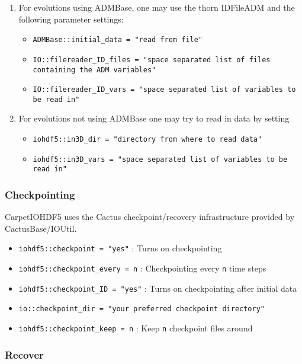 \begin{enumerate}
  \item For evolutions using ADMBase, one may use the thorn IDFileADM and the following parameter settings:
    \begin{itemize}
      \item {\tt ADMBase::initial\_data  = "read from file"}
      \item {\tt IO::filereader\_ID\_files = "space separated list of files containing the ADM variables"}
      \item {\tt IO::filereader\_ID\_vars = "space separated list of variables to be read in"}
    \end{itemize}
  \item For evolutions not using ADMBase one may try to read in data by setting
    \begin{itemize}
      \item {\tt iohdf5::in3D\_dir = "directory from where to read data"}
      \item {\tt iohdf5::in3D\_vars = "space separated list of variables to be read in"}
    \end{itemize}
\end{enumerate}


\subsubsection{Checkpointing}

CarpetIOHDF5 uses the Cactus checkpoint/recovery infrastructure provided by
CactusBase/IOUtil.

\begin{itemize}
  \item {\tt iohdf5::checkpoint = "yes"} : Turns on checkpointing
  \item {\tt iohdf5::checkpoint\_every = n} : Checkpointing every {\tt n} time steps
  \item {\tt iohdf5::checkpoint\_ID = "yes"} : Turns on checkpointing after initial data
  \item {\tt io::checkpoint\_dir = "your preferred checkpoint directory"} 
  \item  {\tt iohdf5::checkpoint\_keep = n} : Keep {\tt n} checkpoint files around
\end{itemize}


\subsubsection{Recover}

